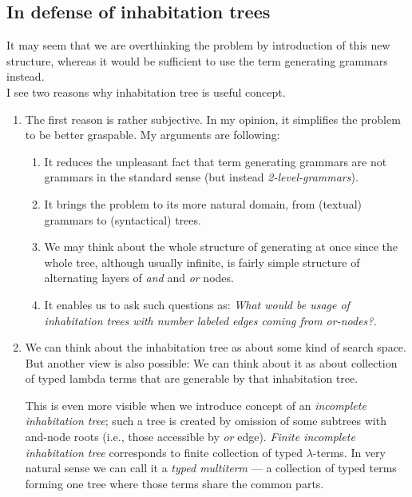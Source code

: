\documentclass[12pt,a4paper]{report}
\newcommand{\lterms}{$\lambda$-terms\xspace}
\newenvironment{todo}
{ ~\\[0.5em]
  {\color{red}\textbf{TODO}}
  \begin{easylist}[itemize]}
{ \end{easylist}
  ~}
\begin{document}


\newpage
\subsection{In defense of inhabitation trees}

It may seem that we are overthinking the problem by introduction
of this new structure, whereas it would be sufficient to
use the term generating grammars instead.\\

I see two reasons why inhabitation tree is useful concept.

\begin{enumerate}
\item The first reason is rather subjective.
      In my opinion, it simplifies the problem to be
      better graspable. My arguments are following: 
      \begin{enumerate}
      \item
      It reduces the unpleasant fact
      that term generating grammars are not grammars in
      the standard sense (but instead \textit{2-level-grammars}). 
      \item
      It brings the problem to 
      its more natural domain, 
      from (textual) grammars 
      to (syntactical) trees.
      \item
      We may think about the whole structure of generating 
      at once since the whole tree, although usually infinite, is
      fairly simple structure of alternating layers of \textit{and} 
      and \textit{or} nodes. 
      \item
      It enables us to ask such questions
      as: \textit{What would be usage of inhabitation trees with 
      number labeled edges coming from \textit{or}-nodes?.}
      \end{enumerate}   
\item We can think about the inhabitation tree as about 
      some kind of search space. But another view is also 
      possible: We can think about it as about collection
      of typed lambda terms that are generable by that inhabitation
      tree. 
      
      This is even more visible when we introduce
      concept of an \textit{incomplete inhabitation tree};
      such a tree is created by omission of some subtrees
      with and-node roots (i.e., those accessible by \textit{or} edge).
      \textit{Finite incomplete inhabitation tree} corresponds
      to finite collection of typed \lterms. In very natural 
      sense we can call it a \textit{typed multiterm} --- a collection
      of typed terms forming one tree where those terms share
      the common parts.
      

\end{enumerate}
\end{document}
